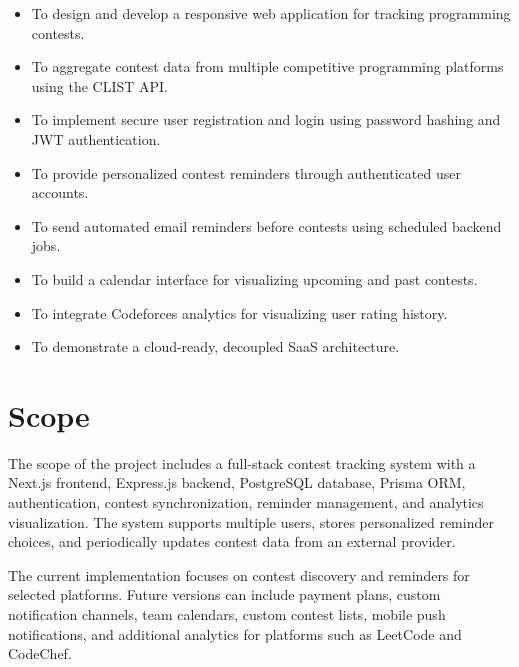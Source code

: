 \documentclass[12pt,a4paper]{report}
\begin{document}
\begin{normalsize}
\begin{itemize}
    \item To design and develop a responsive web application for tracking programming contests.
    \item To aggregate contest data from multiple competitive programming platforms using the CLIST API.
    \item To implement secure user registration and login using password hashing and JWT authentication.
    \item To provide personalized contest reminders through authenticated user accounts.
    \item To send automated email reminders before contests using scheduled backend jobs.
    \item To build a calendar interface for visualizing upcoming and past contests.
    \item To integrate Codeforces analytics for visualizing user rating history.
    \item To demonstrate a cloud-ready, decoupled SaaS architecture.
\end{itemize}

\section{Scope}

The scope of the project includes a full-stack contest tracking system with a Next.js frontend, Express.js backend, PostgreSQL database, Prisma ORM, authentication, contest synchronization, reminder management, and analytics visualization. The system supports multiple users, stores personalized reminder choices, and periodically updates contest data from an external provider.

\vspace{0.3cm}

\noindent
The current implementation focuses on contest discovery and reminders for selected platforms. Future versions can include payment plans, custom notification channels, team calendars, custom contest lists, mobile push notifications, and additional analytics for platforms such as LeetCode and CodeChef.

\end{normalsize}
\end{document}
